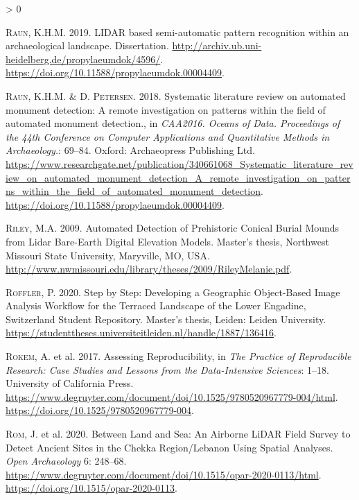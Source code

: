 \documentclass[
  12pt,
]{article}
\newlength{\cslhangindent}
\newenvironment{CSLReferences}[2] %
 {%
  \setlength{\parindent}{0pt}
  \ifodd #1 \everypar{\setlength{\hangindent}{\cslhangindent}}\ignorespaces\fi
  \ifnum #2 > 0
  \setlength{\parskip}{#2\baselineskip}
  \fi
 }%
 {}
\begin{document}
\begin{CSLReferences}{1}{0}
\leavevmode\hypertarget{ref-raunLIDARBasedSemiautomatic2019a}{}%
\textsc{Raun}, K.H.M. 2019. {LIDAR} based semi-automatic pattern recognition within an archaeological landscape. Dissertation. \url{http://archiv.ub.uni-heidelberg.de/propylaeumdok/4596/}. \url{https://doi.org/10.11588/propylaeumdok.00004409}.

\leavevmode\hypertarget{ref-raunSystematicLiteratureReview2018}{}%
\textsc{Raun}, K.H.M. \& D. \textsc{Petersen}. 2018. Systematic literature review on automated monument detection: {A} remote investigation on patterns within the field of automated monument detection., in \emph{{CAA2016}. {Oceans} of {Data}. {Proceedings} of the 44th {Conference} on {Computer} {Applications} and {Quantitative} {Methods} in {Archaeology}.}: 69--84. Oxford: Archaeopress Publishing Ltd. \url{https://www.researchgate.net/publication/340661068_Systematic_literature_review_on_automated_monument_detection_A_remote_investigation_on_patterns_within_the_field_of_automated_monument_detection}. \url{https://doi.org/10.11588/propylaeumdok.00004409}.

\leavevmode\hypertarget{ref-rileyAutomatedDetectionPrehistoric2009a}{}%
\textsc{Riley}, M.A. 2009. Automated {Detection} of {Prehistoric} {Conical} {Burial} {Mounds} from {Lidar} {Bare}-{Earth} {Digital} {Elevation} {Models}. Master's thesis, Northwest Missouri State University, Maryville, MO, USA. \url{http://www.nwmissouri.edu/library/theses/2009/RileyMelanie.pdf}.

\leavevmode\hypertarget{ref-rofflerStepStepDeveloping2020}{}%
\textsc{Roffler}, P. 2020. Step by {Step}: {Developing} a {Geographic} {Object}-{Based} {Image} {Analysis} {Workflow} for the {Terraced} {Landscape} of the {Lower} {Engadine}, {Switzerland} {{}} {Student} {Repository}. Master's thesis, Leiden: Leiden University. \url{https://studenttheses.universiteitleiden.nl/handle/1887/136416}.

\leavevmode\hypertarget{ref-rokemAssessingReproducibility2017}{}%
\textsc{Rokem}, A. et al. 2017. Assessing {Reproducibility}, in \emph{The {Practice} of {Reproducible} {Research}: {Case} {Studies} and {Lessons} from the {Data}-{Intensive} {Sciences}}: 1--18. University of California Press. \url{https://www.degruyter.com/document/doi/10.1525/9780520967779-004/html}. \url{https://doi.org/10.1525/9780520967779-004}.

\leavevmode\hypertarget{ref-romLandSeaAirborne2020b}{}%
\textsc{Rom}, J. et al. 2020. Between {Land} and {Sea}: {An} {Airborne} {LiDAR} {Field} {Survey} to {Detect} {Ancient} {Sites} in the {Chekka} {Region}/{Lebanon} {Using} {Spatial} {Analyses}. \emph{Open Archaeology} 6: 248--68. \url{https://www.degruyter.com/document/doi/10.1515/opar-2020-0113/html}. \url{https://doi.org/10.1515/opar-2020-0113}.


\end{CSLReferences}
\end{document}
